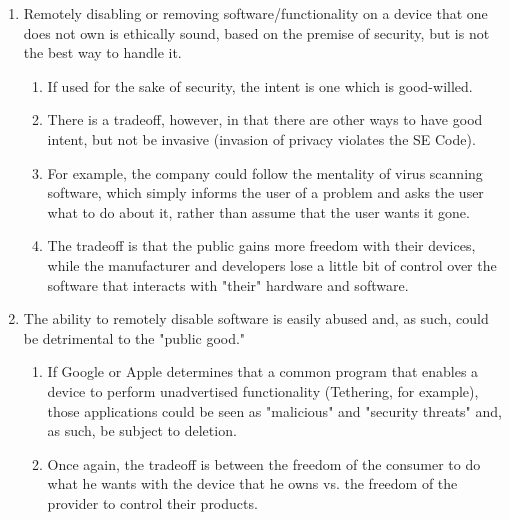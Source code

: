 \documentclass[11pt]{article}
\begin{document}

\begin{enumerate}

\item Remotely disabling or removing software/functionality on a device that one does not own is ethically sound, based on the premise of security, but is not the best way to handle it.

   \begin{enumerate}
   \item If used for the sake of security, the intent is one which is good-willed.
   \item There is a tradeoff, however, in that there are other ways to have good intent, but not be invasive (invasion of privacy violates the SE Code). \cite{secode}
   \item For example, the company could follow the mentality of virus scanning software, which simply informs the user of a problem and asks the user what to do about it, rather than assume that the user wants it gone.
   \item The tradeoff is that the public gains more freedom with their devices, while the manufacturer and developers lose a little bit of control over the software that interacts with "their" hardware and software.
   \end{enumerate}

\item The ability to remotely disable software is easily abused and, as such, could be detrimental to the "public good."

   \begin{enumerate}
   \item If Google or Apple determines that a common program that enables a device to perform unadvertised functionality (Tethering, for example), those applications could be seen as "malicious" and "security threats" and, as such, be subject to deletion.
   \item Once again, the tradeoff is between the freedom of the consumer to do what he wants with the device that he owns vs. the freedom of the provider to control their products.
   \end{enumerate}


\end{enumerate}
\end{document}
